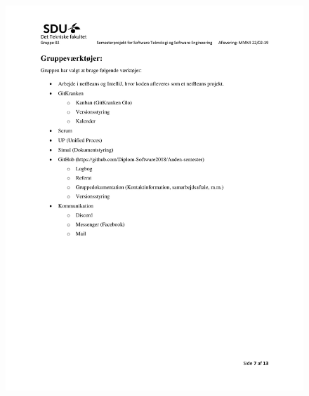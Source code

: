 \begin{figure}[hb]
  \includegraphics[scale = 0.33]{./PNG/Projektforslag/Projektforslag-07.jpg} 
\end{figure}

